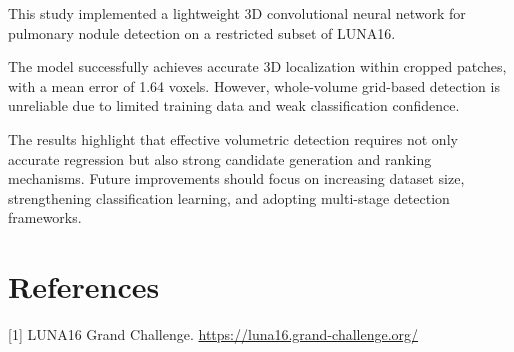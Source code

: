 \documentclass[conference]{IEEEtran}
\begin{document}
This study implemented a lightweight 3D convolutional neural network for pulmonary nodule detection on a restricted subset of LUNA16. 

The model successfully achieves accurate 3D localization within cropped patches, with a mean error of 1.64 voxels. However, whole-volume grid-based detection is unreliable due to limited training data and weak classification confidence.

The results highlight that effective volumetric detection requires not only accurate regression but also strong candidate generation and ranking mechanisms. Future improvements should focus on increasing dataset size, strengthening classification learning, and adopting multi-stage detection frameworks.

\section*{References}

[1] LUNA16 Grand Challenge. \url{https://luna16.grand-challenge.org/}
\end{document}
